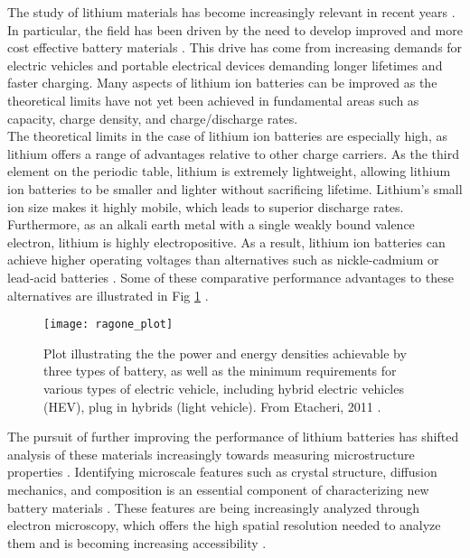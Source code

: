 



 

The study of lithium materials has become increasingly relevant in recent years \cite{nitta_li-ion_2015}.  In particular, the field has been driven by the need to develop improved  and more cost effective battery materials \cite{nitta_li-ion_2015}.  This drive has come from increasing demands for electric vehicles and portable electrical devices demanding longer lifetimes and faster charging.  Many aspects of lithium ion batteries can be improved as the theoretical limits have not yet been achieved in fundamental areas such as capacity, charge density, and charge/discharge rates. \\


The theoretical limits in the case of lithium ion batteries are especially high, as lithium offers a range of advantages relative to other charge carriers. As the third element on the periodic table, lithium is extremely lightweight, allowing lithium ion batteries to be smaller and lighter without sacrificing lifetime.  Lithium's small ion size makes it highly mobile, which leads to superior discharge rates.   Furthermore, as an alkali earth metal with a single weakly bound valence electron, lithium is highly electropositive.   As a result, lithium ion batteries can achieve higher operating voltages than alternatives such as nickle-cadmium or lead-acid batteries \cite{etacheri_challenges_2011}.  Some of these comparative performance advantages to these alternatives are illustrated in Fig \ref{ragone} \cite{etacheri_challenges_2011}.\\

\begin{figure}
	\centering
	\texttt{[image: ragone\_plot]}
	\caption{Plot illustrating the the power and energy densities achievable by three types of battery, as well as the minimum requirements for various types of electric vehicle, including hybrid electric vehicles (HEV), plug in hybrids (light vehicle). From Etacheri, 2011 \cite{etacheri_challenges_2011}. }
	\label{ragone}
	
\end{figure}
The pursuit of further improving the performance of lithium batteries has shifted analysis of these materials increasingly towards measuring microstructure properties \cite{lu_lithium_2012,arthur_spontaneous_2016, muller_quantification_2018}. Identifying microscale features such as crystal structure, diffusion mechanics, and composition is an essential component of characterizing new battery materials \cite{van_der_ven_first-principles_2001}. These features are being increasingly analyzed through electron microscopy, which offers the high spatial resolution needed to analyze them and is becoming increasing accessibility   \cite{chiu_aqueous_2013,inkson_2_2016, hansen_atomic-resolution_2001}. \\

